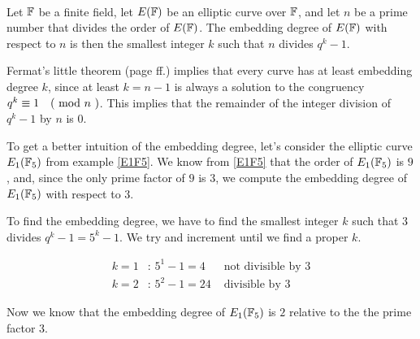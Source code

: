 \begin{definition}{}\label{def:embedding-degree}\\
Let $\mathbb{F}$ be a finite field, let $E(\mathbb{F})$ be an elliptic curve over $\mathbb{F}$, and let $n$ be a prime number that divides the order of $E(\mathbb{F})$. The embedding degree of $E(\mathbb{F})$ with respect to $n$ is then the smallest integer $k$ such that $n$ divides $q^k-1$. 
\end{definition}

Fermat's little theorem (page \pageref{fermats-little-theorem} ff.) implies that every curve has at least  embedding degree $k$, since at least $k=n-1$ is always a solution to the congruency 
$q^k \equiv 1 \quad \text{( mod } n \text{ )}$. This implies that the remainder of the integer division of $q^k-1$ by $n$ is $0$.

\begin{example} To get a better intuition of the embedding degree, let's consider the elliptic curve $E_1(\mathbb{F}_5)$ from example \ref{E1F5}. We know from \ref{E1F5} that the order of $E_1(\mathbb{F}_5)$ is $9$, and, since the only prime factor of $9$ is $3$, we compute the embedding degree of $E_1(\mathbb{F}_5)$ with respect to $3$. 

To find the embedding degree, we have to find the smallest integer $k$ such that $3$ divides $q^k-1= 5^k-1$. We try and increment until we find a proper $k$. 

\begin{align*}
k=1 &\text{: } 5^1-1 = 4 & \text{ not divisible by } 3\\ 
k=2 &\text{: } 5^2-1 = 24 & \text{ divisible by } 3
\end{align*} 

Now we know that the embedding degree of $E_1(\mathbb{F}_5)$ is $2$ relative to the the prime factor $3$.
\end{example}

